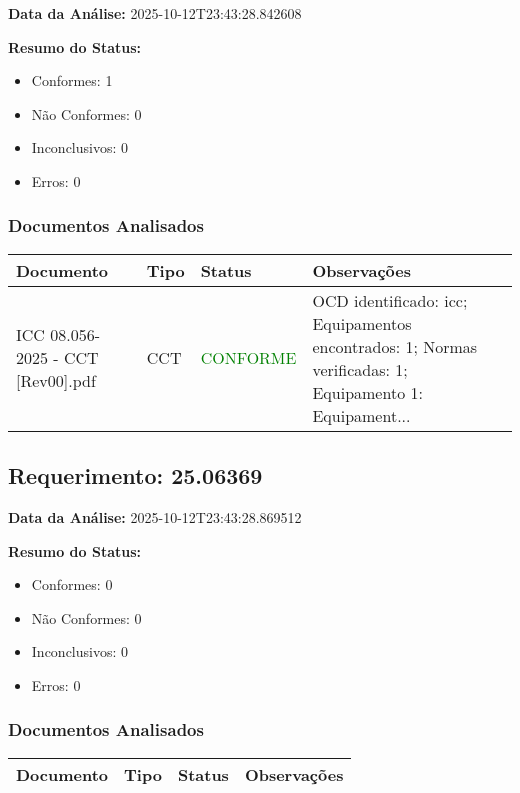 \documentclass[12pt,a4paper]{article}
\begin{document}
\textbf{Data da Análise:} 2025-10-12T23:43:28.842608

\textbf{Resumo do Status:}
\begin{itemize}
    \item Conformes: 1
    \item Não Conformes: 0
    \item Inconclusivos: 0
    \item Erros: 0
\end{itemize}

\subsubsection{Documentos Analisados}

\begin{longtable}{|p{4cm}|p{2cm}|p{2cm}|p{6cm}|}
\hline
\textbf{Documento} & \textbf{Tipo} & \textbf{Status} & \textbf{Observações} \\
\hline
\endhead
ICC 08.056-2025 - CCT [Rev00].pdf & CCT & \textcolor{green}{CONFORME} & OCD identificado: icc; Equipamentos encontrados: 1; Normas verificadas: 1; Equipamento 1: Equipament... \\
\hline
\end{longtable}


\subsection{Requerimento: 25.06369}

\textbf{Data da Análise:} 2025-10-12T23:43:28.869512

\textbf{Resumo do Status:}
\begin{itemize}
    \item Conformes: 0
    \item Não Conformes: 0
    \item Inconclusivos: 0
    \item Erros: 0
\end{itemize}

\subsubsection{Documentos Analisados}

\begin{longtable}{|p{4cm}|p{2cm}|p{2cm}|p{6cm}|}
\hline
\textbf{Documento} & \textbf{Tipo} & \textbf{Status} & \textbf{Observações} \\
\hline
\endhead
\end{longtable}
\end{document}
